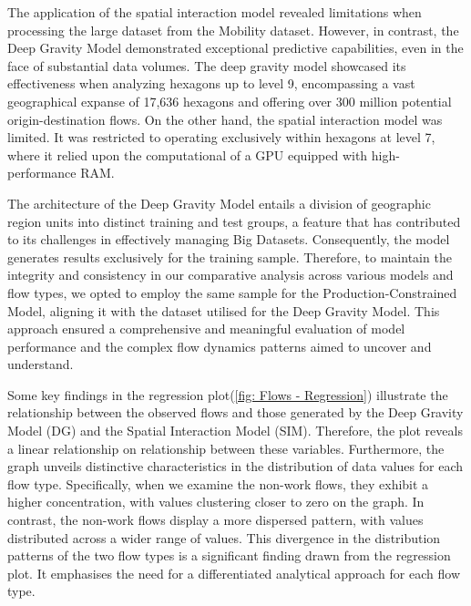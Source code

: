     The application of the spatial interaction model revealed limitations when processing the large dataset from the Mobility dataset. However, in contrast, the Deep Gravity Model demonstrated exceptional predictive capabilities, even in the face of substantial data volumes. The deep gravity model showcased its effectiveness when analyzing hexagons up to level 9, encompassing a vast geographical expanse of 17,636 hexagons and offering over 300 million potential origin-destination flows. On the other hand, the spatial interaction model was limited. It was restricted to operating exclusively within hexagons at level 7, where it relied upon the computational of a GPU equipped with high-performance RAM.

    The architecture of the Deep Gravity Model entails a division of geographic region units into distinct training and test groups, a feature that has contributed to its challenges in effectively managing Big Datasets. Consequently, the model generates results exclusively for the training sample. Therefore, to maintain the integrity and consistency in our comparative analysis across various models and flow types, we opted to employ the same sample for the Production-Constrained Model, aligning it with the dataset utilised for the Deep Gravity Model. This approach ensured a comprehensive and meaningful evaluation of model performance and the complex flow dynamics patterns aimed to uncover and understand.

    Some key findings in the regression plot(\ref{fig: Flows - Regression}) illustrate the relationship between the observed flows and those generated by the Deep Gravity Model (DG) and the Spatial Interaction Model (SIM). Therefore, the plot reveals a linear relationship on relationship between these variables. Furthermore, the graph unveils distinctive characteristics in the distribution of data values for each flow type. Specifically, when we examine the non-work flows, they exhibit a higher concentration, with values clustering closer to zero on the graph. In contrast, the non-work flows display a more dispersed pattern, with values distributed across a wider range of values. This divergence in the distribution patterns of the two flow types is a significant finding drawn from the regression plot. It emphasises the need for a differentiated analytical approach for each flow type.


